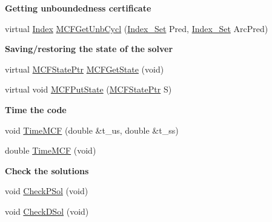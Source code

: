 \begin{Indent}\textbf{ Getting unboundedness certificate}\par
\begin{DoxyCompactItemize}
\item 
virtual \mbox{\hyperlink{class_m_c_f_class_ad53d6229d7ec28555a9c9c2fd9abf773}{Index}} \mbox{\hyperlink{class_m_c_f_class_a88fa193007f0bc6ef751664a9f4c75a2}{M\+C\+F\+Get\+Unb\+Cycl}} (\mbox{\hyperlink{class_m_c_f_class_ace3388eb329ff0551a0b86b6c67e33d8}{Index\+\_\+\+Set}} Pred, \mbox{\hyperlink{class_m_c_f_class_ace3388eb329ff0551a0b86b6c67e33d8}{Index\+\_\+\+Set}} Arc\+Pred)
\end{DoxyCompactItemize}
\end{Indent}
\begin{Indent}\textbf{ Saving/restoring the state of the solver}\par
\begin{DoxyCompactItemize}
\item 
virtual \mbox{\hyperlink{class_m_c_f_class_ab547218814e3b90d15f219f5aaf8b937}{M\+C\+F\+State\+Ptr}} \mbox{\hyperlink{class_m_c_f_class_a995a05ecaa6ece4be3afbddbb36b2c4e}{M\+C\+F\+Get\+State}} (void)
\item 
virtual void \mbox{\hyperlink{class_m_c_f_class_ac14589cd80aed231b6fc7da247f50601}{M\+C\+F\+Put\+State}} (\mbox{\hyperlink{class_m_c_f_class_ab547218814e3b90d15f219f5aaf8b937}{M\+C\+F\+State\+Ptr}} S)
\end{DoxyCompactItemize}
\end{Indent}
\begin{Indent}\textbf{ Time the code}\par
\begin{DoxyCompactItemize}
\item 
void \mbox{\hyperlink{class_m_c_f_class_a779a8829874de569dc0e09f40b6cd569}{Time\+M\+CF}} (double \&t\+\_\+us, double \&t\+\_\+ss)
\item 
double \mbox{\hyperlink{class_m_c_f_class_a25ce05b3fabc8d4f80332a02bce2a623}{Time\+M\+CF}} (void)
\end{DoxyCompactItemize}
\end{Indent}
\begin{Indent}\textbf{ Check the solutions}\par
\begin{DoxyCompactItemize}
\item 
void \mbox{\hyperlink{class_m_c_f_class_a41b70e84f98f30b408d0ffb191ff4442}{Check\+P\+Sol}} (void)
\item 
void \mbox{\hyperlink{class_m_c_f_class_a81bd6bc3b87534b4a67d0d93abedbd93}{Check\+D\+Sol}} (void)
\end{DoxyCompactItemize}
\end{Indent}
